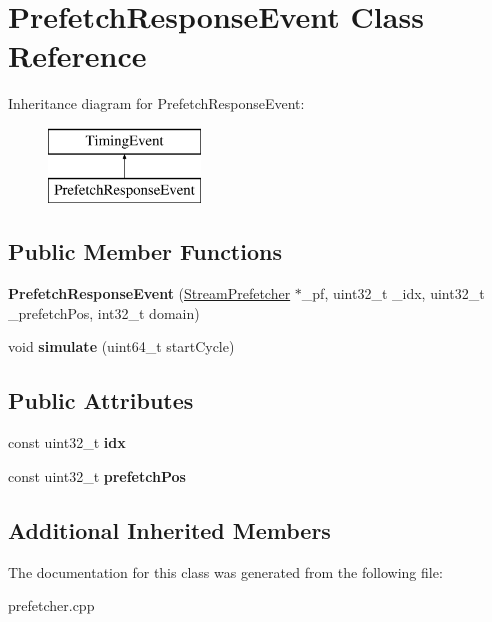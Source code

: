 \hypertarget{classPrefetchResponseEvent}{\section{Prefetch\-Response\-Event Class Reference}
\label{classPrefetchResponseEvent}
}
Inheritance diagram for Prefetch\-Response\-Event\-:\begin{figure}[H]
\begin{center}
\leavevmode
\includegraphics[height=2.000000cm]{classPrefetchResponseEvent}
\end{center}
\end{figure}
\subsection*{Public Member Functions}
\begin{DoxyCompactItemize}
\item 
\hypertarget{classPrefetchResponseEvent_a7fda0fae94e25d26f0126073bfc0a0a8}{{\bfseries Prefetch\-Response\-Event} (\hyperlink{classStreamPrefetcher}{Stream\-Prefetcher} $\ast$\-\_\-pf, uint32\-\_\-t \-\_\-idx, uint32\-\_\-t \-\_\-prefetch\-Pos, int32\-\_\-t domain)}\label{classPrefetchResponseEvent_a7fda0fae94e25d26f0126073bfc0a0a8}

\item 
\hypertarget{classPrefetchResponseEvent_ae8c0fcc2487d673e40c88552942d89e6}{void {\bfseries simulate} (uint64\-\_\-t start\-Cycle)}\label{classPrefetchResponseEvent_ae8c0fcc2487d673e40c88552942d89e6}

\end{DoxyCompactItemize}
\subsection*{Public Attributes}
\begin{DoxyCompactItemize}
\item 
\hypertarget{classPrefetchResponseEvent_a921629091ced8e02fda983249a155699}{const uint32\-\_\-t {\bfseries idx}}\label{classPrefetchResponseEvent_a921629091ced8e02fda983249a155699}

\item 
\hypertarget{classPrefetchResponseEvent_ad6b9ffabd13a0af5356fb6ef3ffae7db}{const uint32\-\_\-t {\bfseries prefetch\-Pos}}\label{classPrefetchResponseEvent_ad6b9ffabd13a0af5356fb6ef3ffae7db}

\end{DoxyCompactItemize}
\subsection*{Additional Inherited Members}


The documentation for this class was generated from the following file\-:\begin{DoxyCompactItemize}
\item 
prefetcher.\-cpp\end{DoxyCompactItemize}
